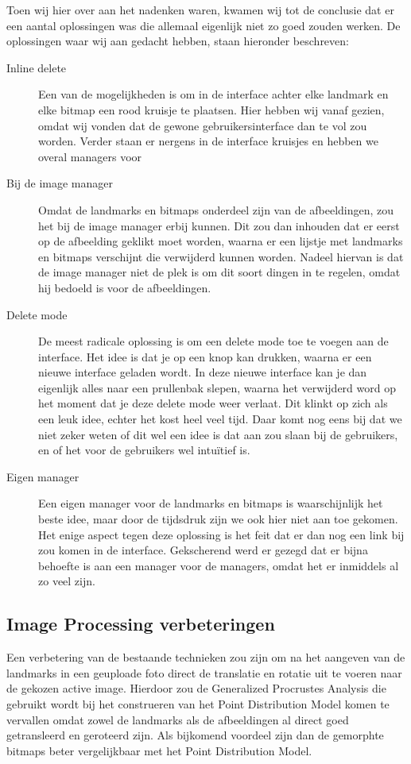 Toen wij hier over aan het nadenken waren, kwamen wij tot de conclusie dat er een aantal oplossingen was die allemaal eigenlijk niet zo goed zouden werken.
De oplossingen waar wij aan gedacht hebben, staan hieronder beschreven:
\\
\begin{description}
  \item[Inline delete] Een van de mogelijkheden is om in de interface achter elke landmark en elke bitmap een rood kruisje te plaatsen.
  Hier hebben wij vanaf gezien, omdat wij vonden dat de gewone gebruikersinterface dan te vol zou worden.
  Verder staan er nergens in de interface kruisjes en hebben we overal managers voor
  \item[Bij de image manager] Omdat de landmarks en bitmaps onderdeel zijn van de afbeeldingen, zou het bij de image manager erbij kunnen.
  Dit zou dan inhouden dat er eerst op de afbeelding geklikt moet worden, waarna er een lijstje met landmarks en bitmaps verschijnt die verwijderd kunnen worden.
  Nadeel hiervan is dat de image manager niet de plek is om dit soort dingen in te regelen, omdat hij bedoeld is voor de afbeeldingen.
  \item[Delete mode]De meest radicale oplossing is om een delete mode toe te voegen aan de interface.
  Het idee is dat je op een knop kan drukken, waarna er een nieuwe interface geladen wordt.
  In deze nieuwe interface kan je dan eigenlijk alles naar een prullenbak slepen, waarna het verwijderd word op het moment dat je deze delete mode weer verlaat.
  Dit klinkt op zich als een leuk idee, echter het kost heel veel tijd.
  Daar komt nog eens bij dat we niet zeker weten of dit wel een idee is dat aan zou slaan bij de gebruikers, en of het voor de gebruikers wel intu\"{i}tief is.
  \item[Eigen manager] Een eigen manager voor de landmarks en bitmaps is waarschijnlijk het beste idee, maar door de tijdsdruk zijn we ook hier niet aan toe gekomen.
  Het enige aspect tegen deze oplossing is het feit dat er dan nog een link bij zou komen in de interface.
  Gekscherend werd er gezegd dat er bijna behoefte is aan een manager voor de managers, omdat het er inmiddels al zo veel zijn.
\end{description}

\subsection{Image Processing verbeteringen}
Een verbetering van de bestaande technieken zou zijn om na het aangeven van de landmarks in een geuploade foto direct de translatie en rotatie uit te voeren naar de gekozen active image. Hierdoor zou de Generalized Procrustes Analysis die gebruikt wordt bij het construeren van het Point Distribution Model komen te vervallen omdat zowel de landmarks als de afbeeldingen al direct goed getransleerd en geroteerd zijn. Als bijkomend voordeel zijn dan de gemorphte bitmaps beter vergelijkbaar met het Point Distribution Model.

